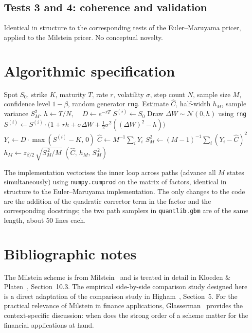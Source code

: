 \documentclass[11pt,a4paper]{article}
\theoremstyle{plain}
\theoremstyle{definition}
\theoremstyle{remark}
\begin{document}
\subsection{Tests 3 and 4: coherence and validation}

Identical in structure to the corresponding tests of the Euler--Maruyama
pricer, applied to the Milstein pricer. No conceptual novelty.

\section{Algorithmic specification}
\label{sec:algorithm}

\begin{algorithm}[H]
\caption{Milstein Monte Carlo for the European call (GBM)}
\label{alg:mc-milstein}
\begin{algorithmic}[1]
\Require Spot $S_0$, strike $K$, maturity $T$, rate $r$, volatility
$\sigma$, step count $N$, sample size $M$, confidence level
$1 - \beta$, random generator \texttt{rng}.
\Ensure Estimate $\hat C$, half-width $h_M$, sample variance $S_M^2$.
\State $h \gets T / N$,
$\quad D \gets e^{-rT}$
\State $S^{(i)} \gets S_0$
\State Draw $\Delta W \sim \mathcal{N}(0, h)$ using \texttt{rng}
\State $S^{(i)} \gets S^{(i)} \cdot \big(1 + r h
+ \sigma \Delta W + \tfrac{1}{2} \sigma^2 ((\Delta W)^2 - h)\big)$
\EndFor
\State $Y_i \gets D \cdot \max(S^{(i)} - K,\, 0)$
\EndFor
\State $\hat C \gets M^{-1} \sum_i Y_i$
\State $S_M^2 \gets (M-1)^{-1} \sum_i (Y_i - \hat C)^2$
\State $h_M \gets z_{\beta/2}\, \sqrt{S_M^{\,2}/M}$
\State \Return $(\hat C,\, h_M,\, S_M^{\,2})$
\end{algorithmic}
\end{algorithm}

The implementation vectorises the inner loop across paths (advance
all $M$ states simultaneously) using \texttt{numpy.cumprod} on the
matrix of factors, identical in structure to the Euler--Maruyama
implementation. The only changes to the code are the addition of the
quadratic corrector term in the factor and the corresponding
docstrings; the two path samplers in \texttt{quantlib.gbm} are of the
same length, about 50 lines each.

\section{Bibliographic notes}
\label{sec:biblio}

The Milstein scheme is from Milstein~\cite{Milstein1974} and is
treated in detail in Kloeden \& Platen~\cite{KloedenPlaten},
Section~10.3. The empirical
side-by-side comparison study designed here is a direct adaptation
of the comparison study in Higham~\cite{Higham2001}, Section~5. For
the practical relevance of Milstein in finance applications,
Glasserman~\cite[Section~6.1]{Glasserman} provides the
context-specific discussion: when does the strong order of a scheme
matter for the financial applications at hand.
\end{document}
